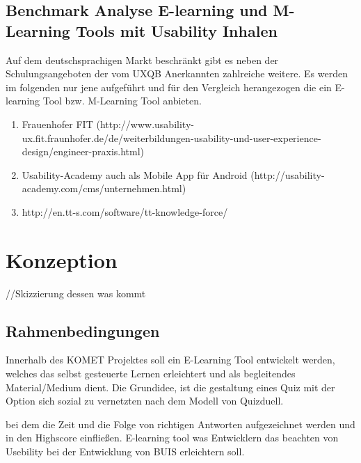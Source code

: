 \documentclass[a4paper, 12pt, twoside, BCOR=20mm, DIV=calc, abstracton, parskip=half*, toc=bibliography, toc=listof, headsepline, footsepline, headings=small, numbers=enddot]{scrreprt}
\begin{document}
	\section{Benchmark Analyse E-learning und M-Learning Tools mit Usability Inhalen}
	Auf dem deutschsprachigen Markt beschränkt gibt es neben der Schulungsangeboten der vom \ac{UXQB} Anerkannten zahlreiche weitere. Es werden im folgenden nur jene aufgeführt und für den Vergleich herangezogen die ein E-learning Tool bzw. M-Learning Tool anbieten. 
	\begin{enumerate}
		\item Frauenhofer FIT (http://www.usability-ux.fit.fraunhofer.de/de/weiterbildungen-usability-und-user-experience-design/engineer-praxis.html)
		\item Usability-Academy  auch als Mobile App für Android (http://usability-academy.com/cms/unternehmen.html)
		\item http://en.tt-s.com/software/tt-knowledge-force/
	\end{enumerate}
	
	
	\chapter{Konzeption} //Skizzierung dessen was kommt 
	\section{Rahmenbedingungen}
	Innerhalb des KOMET Projektes soll ein E-Learning Tool entwickelt werden, welches das selbst gesteuerte Lernen erleichtert und als begleitendes Material/Medium dient. 
	Die Grundidee, ist die gestaltung eines Quiz mit der Option sich sozial zu vernetzten nach dem Modell von Quizduell. 
	
	 bei dem die Zeit und die Folge von richtigen Antworten aufgezeichnet werden und in den Highscore einfließen.
	E-learning tool was Entwicklern das beachten von Usebility bei der Entwicklung von BUIS erleichtern soll.  
	
	
\end{document}
